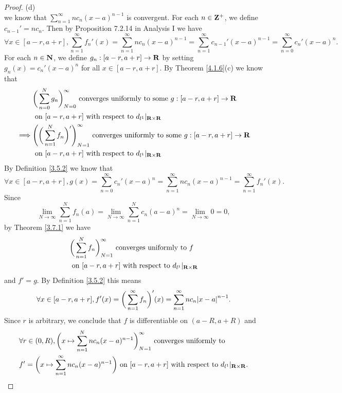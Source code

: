 \begin{proof}{(d)}
\[    \]
    we know that \(\sum_{n = 1}^\infty n c_n (x - a)^{n - 1}\) is convergent.
    For each \(n \in \mathbf{Z}^+\), we define \(c_{n - 1}' = n c_n\).
    Then by Proposition 7.2.14 in Analysis I we have
    \[
        \forall x \in [a - r, a + r], \sum_{n = 1}^\infty f_n'(x) = \sum_{n = 1}^\infty n c_n (x - a)^{n - 1} = \sum_{n = 1}^\infty c_{n - 1}' (x - a)^{n - 1} = \sum_{n = 0}^\infty c_n' (x - a)^n.
    \]
    For each \(n \in \mathbf{N}\), we define \(g_n : [a - r, a + r] \to \mathbf{R}\) by setting \(g_n(x) = c_n' (x - a)^n\) for all \(x \in [a - r, a + r]\).
    By Theorem \ref{4.1.6}(c) we know that
    \begin{align*}
                 & \bigg(\sum_{n = 0}^N g_n\bigg)_{N = 0}^\infty \text{ converges uniformly to some } g : [a - r, a + r] \to \mathbf{R}              \\
                 & \text{ on } [a - r, a + r] \text{ with respect to } d_{l^1}|_{\mathbf{R} \times \mathbf{R}}                                               \\
        \implies & \Bigg(\bigg(\sum_{n = 1}^N f_n\bigg)'\Bigg)_{N = 1}^\infty \text{ converges uniformly to some } g : [a - r, a + r] \to \mathbf{R} \\
                 & \text{ on } [a - r, a + r] \text{ with respect to } d_{l^1}|_{\mathbf{R} \times \mathbf{R}}
    \end{align*}
    By Definition \ref{3.5.2} we know that
    \[
        \forall x \in [a - r, a + r], g(x) = \sum_{n = 0}^\infty c_n' (x - a)^n = \sum_{n = 1}^\infty n c_n (x - a)^{n - 1} = \sum_{n = 1}^\infty f_n'(x).
    \]
    Since
    \[
        \lim_{N \to \infty} \sum_{n = 1}^N f_n(a) = \lim_{N \to \infty} \sum_{n = 1}^N c_n (a - a)^n = \lim_{N \to \infty} 0 = 0,
    \]
    by Theorem \ref{3.7.1} we have
    \begin{align*}
         & \bigg(\sum_{n = 1}^N f_n\bigg)_{N = 1}^\infty \text{ converges uniformly to } f \\
         & \text{ on } [a - r, a + r] \text{ with respect to } d_{l^1}|_{\mathbf{R} \times \mathbf{R}}
    \end{align*}
    and \(f' = g\).
    By Definition \ref{3.5.2} this means
    \[
        \forall x \in [a - r, a + r], f'(x) = \bigg(\sum_{n = 1}^\infty f_n\bigg)'(x) = \sum_{n = 1}^\infty n c_n \abs{x - a}^{n - 1}.
    \]
    Since \(r\) is arbitrary, we conclude that \(f\) is differentiable on \((a - R, a + R)\) and
    \begin{align*}
         & \forall r \in (0, R), \bigg(x \mapsto \sum_{n = 1}^N n c_n (x - a)^{n - 1}\bigg)_{N = 1}^\infty \text{ converges uniformly to }                   \\
         & f' = \bigg(x \mapsto \sum_{n = 1}^\infty n c_n (x - a)^{n - 1}\bigg) \text{ on } [a - r, a + r] \text{ with respect to } d_{l^1}|_{\mathbf{R} \times \mathbf{R}}.
    \end{align*}
\end{proof}

